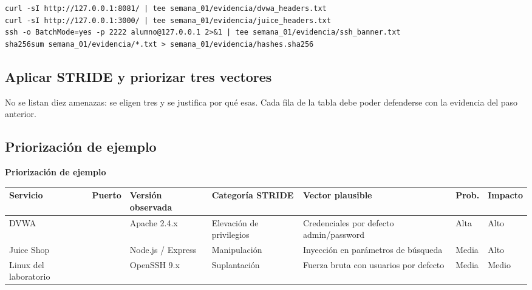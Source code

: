 \documentclass[11pt,a4paper]{article}
\begin{document}
\begin{lstlisting}[style=estiloCodigo]
curl -sI http://127.0.0.1:8081/ | tee semana_01/evidencia/dvwa_headers.txt
curl -sI http://127.0.0.1:3000/ | tee semana_01/evidencia/juice_headers.txt
ssh -o BatchMode=yes -p 2222 alumno@127.0.0.1 2>&1 | tee semana_01/evidencia/ssh_banner.txt
sha256sum semana_01/evidencia/*.txt > semana_01/evidencia/hashes.sha256
\end{lstlisting}

\subsection{Aplicar STRIDE y priorizar tres vectores}

No se listan diez amenazas: se eligen tres y se justifica por qué esas. Cada fila de la tabla debe poder defenderse con la evidencia del paso anterior.

\subsection{Priorización de ejemplo}

\begin{center}
\begin{minipage}{\linewidth}
\centering
{\footnotesize
\textbf{Priorización de ejemplo}\par\smallskip
\begin{tabular}{@{}>{\raggedright\arraybackslash}p{2.20cm}>{\raggedright\arraybackslash}p{0.90cm}>{\raggedright\arraybackslash}p{1.90cm}>{\raggedright\arraybackslash}p{2.40cm}>{\raggedright\arraybackslash}p{3.20cm}>{\raggedright\arraybackslash}p{1.05cm}>{\raggedright\arraybackslash}p{1.35cm}@{}}
\toprule
\textbf{Servicio} & \textbf{Puerto} & \textbf{Versión observada} & \textbf{Categoría STRIDE} & \textbf{Vector plausible} & \textbf{Prob.} & \textbf{Impacto} \\
\midrule
DVWA & 8081 & Apache 2.4.x & Elevación de privilegios & Credenciales por defecto admin/password & Alta & Alto \\
Juice Shop & 3000 & Node.js / Express & Manipulación & Inyección en parámetros de búsqueda & Media & Alto \\
Linux del laboratorio & 2222 & OpenSSH 9.x & Suplantación & Fuerza bruta con usuarios por defecto & Media & Medio \\
\bottomrule
\end{tabular}
}
\par{}
\end{minipage}
\end{center}
\end{document}
